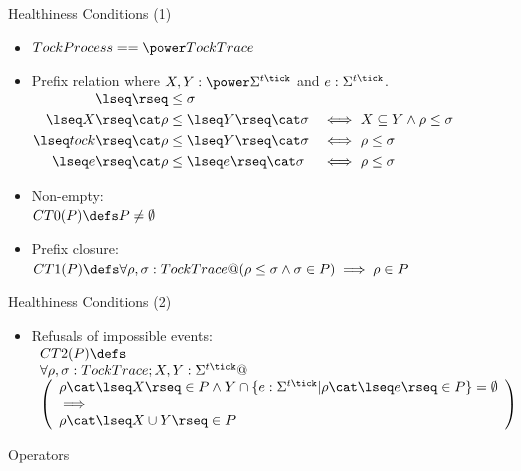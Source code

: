 \documentclass[fleqn]{beamer}
\newenvironment{slide-nocite}[1]
{\begin{frame}[fragile,environment=slide-nocite]
\frametitle{#1}\begin{refsegment}}
{\end{refsegment}\end{frame}}%
\begin{document}
\begin{slide-nocite}{Healthiness Conditions (1)}
  \begin{itemize}
    \item $TockProcess == \power TockTrace$\\
    \item Prefix relation where $X, Y : \power \Sigma^{t\tick}$ and $e : \Sigma^{t\tick}$.\\
      $\begin{aligned}
          \lseq\rseq                   &\le  \sigma
        \\\lseq X \rseq \cat \rho      &\le  \lseq Y \rseq \cat \sigma &\iff&~ X \subseteq Y \land \rho \le \sigma
        \\\lseq tock \rseq \cat \rho   &\le  \lseq Y \rseq \cat \sigma &\iff&~ \rho \le \sigma
        \\\lseq e \rseq \cat \rho      &\le  \lseq e \rseq \cat \sigma &\iff&~ \rho \le \sigma
      \end{aligned}$
  \end{itemize}
  \begin{itemize}
    \item Non-empty:\\
    $CT0(P) \circdef P \neq \emptyset$
    \item Prefix closure:\\
    $CT1(P) \circdef \forall \rho, \sigma : TockTrace @ (\rho \le \sigma \land \sigma \in P) \implies \rho \in P$
  \end{itemize}
\end{slide-nocite}

\begin{slide-nocite}{Healthiness Conditions (2)}
  \begin{itemize}
    \item Refusals of impossible events:\\
    $\begin{array}{l}
      CT2(P) \circdef \\
        \forall \rho, \sigma : TockTrace; X, Y: \Sigma^{t\tick} @ \\
        \left(\begin{array}{l}
          \rho \cat \lseq X \rseq \in P \land Y \cap \{e : \Sigma^{t\tick} | \rho \cat \lseq e \rseq \in P\} = \emptyset
          \\ \implies \\
          \rho \cat \lseq X \cup Y \rseq \in P
        \end{array}\right)
      \end{array}$
  \end{itemize}
\end{slide-nocite}


\begin{slide-nocite}{Operators}
\end{slide-nocite}
\end{document}
